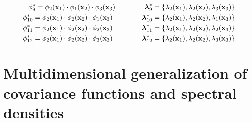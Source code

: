\documentclass[]{interact}
\theoremstyle{plain}%
\theoremstyle{definition}
\theoremstyle{remark}
\begin{document}
\begin{eqnarray}
%
\phi^{\ast}_9= \phi_{2}(\mathbf{x}_1) \cdot \phi_{1}(\mathbf{x}_2) \cdot \phi_{3}(\mathbf{x}_3) \hspace{1.5cm} \boldsymbol{\lambda}^{\ast}_9= \{\lambda_2(\mathbf{x}_1), \lambda_2(\mathbf{x}_2), \lambda_3(\mathbf{x}_3)\} \nonumber \\
%
\phi^{\ast}_{10}= \phi_{2}(\mathbf{x}_1) \cdot \phi_{2}(\mathbf{x}_2) \cdot \phi_{1}(\mathbf{x}_3) \hspace{1.5cm} \boldsymbol{\lambda}^{\ast}_{10}= \{\lambda_2(\mathbf{x}_1), \lambda_2(\mathbf{x}_2), \lambda_1(\mathbf{x}_3)\} \nonumber \\
%
\phi^{\ast}_{11}= \phi_{2}(\mathbf{x}_1) \cdot \phi_{2}(\mathbf{x}_2) \cdot \phi_{2}(\mathbf{x}_3) \hspace{1.5cm} \boldsymbol{\lambda}^{\ast}_{11}= \{\lambda_2(\mathbf{x}_1), \lambda_2(\mathbf{x}_2), \lambda_2(\mathbf{x}_3)\} \nonumber \\
%
\phi^{\ast}_{12}= \phi_{2}(\mathbf{x}_1) \cdot \phi_{2}(\mathbf{x}_2) \cdot \phi_{3}(\mathbf{x}_3) \hspace{1.5cm} \boldsymbol{\lambda}^{\ast}_{12}= \{\lambda_2(\mathbf{x}_1), \lambda_2(\mathbf{x}_2), \lambda_3(\mathbf{x}_3)\} \nonumber
\end{eqnarray}


\section{Multidimensional generalization of covariance functions and spectral densities}
\end{document}
